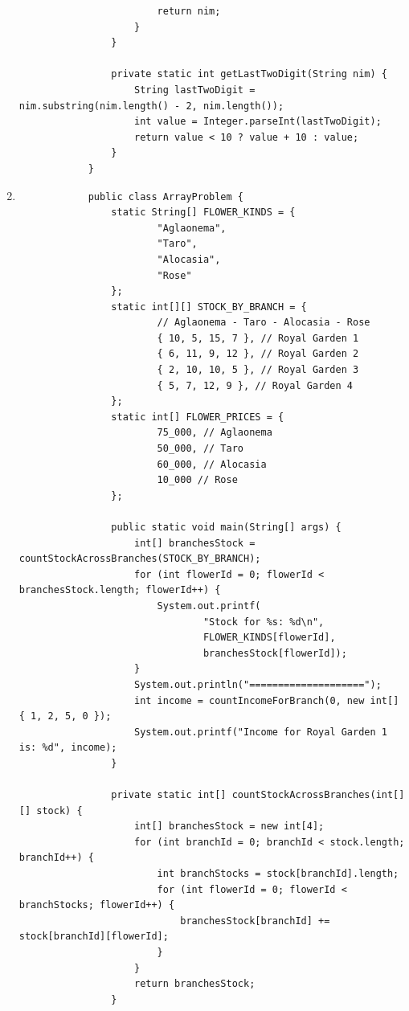 \documentclass[12pt,titlepage]{article}
\begin{document}
\begin{enumerate}
{\begin{verbatim}
                        return nim;
                    }
                }

                private static int getLastTwoDigit(String nim) {
                    String lastTwoDigit = nim.substring(nim.length() - 2, nim.length());
                    int value = Integer.parseInt(lastTwoDigit);
                    return value < 10 ? value + 10 : value;
                }
            }
        \end{verbatim}
    }
    \item {
        \begin{verbatim}
            public class ArrayProblem {
                static String[] FLOWER_KINDS = {
                        "Aglaonema",
                        "Taro",
                        "Alocasia",
                        "Rose"
                };
                static int[][] STOCK_BY_BRANCH = {
                        // Aglaonema - Taro - Alocasia - Rose
                        { 10, 5, 15, 7 }, // Royal Garden 1
                        { 6, 11, 9, 12 }, // Royal Garden 2
                        { 2, 10, 10, 5 }, // Royal Garden 3
                        { 5, 7, 12, 9 }, // Royal Garden 4
                };
                static int[] FLOWER_PRICES = {
                        75_000, // Aglaonema
                        50_000, // Taro
                        60_000, // Alocasia
                        10_000 // Rose
                };

                public static void main(String[] args) {
                    int[] branchesStock = countStockAcrossBranches(STOCK_BY_BRANCH);
                    for (int flowerId = 0; flowerId < branchesStock.length; flowerId++) {
                        System.out.printf(
                                "Stock for %s: %d\n",
                                FLOWER_KINDS[flowerId],
                                branchesStock[flowerId]);
                    }
                    System.out.println("====================");
                    int income = countIncomeForBranch(0, new int[] { 1, 2, 5, 0 });
                    System.out.printf("Income for Royal Garden 1 is: %d", income);
                }

                private static int[] countStockAcrossBranches(int[][] stock) {
                    int[] branchesStock = new int[4];
                    for (int branchId = 0; branchId < stock.length; branchId++) {
                        int branchStocks = stock[branchId].length;
                        for (int flowerId = 0; flowerId < branchStocks; flowerId++) {
                            branchesStock[branchId] += stock[branchId][flowerId];
                        }
                    }
                    return branchesStock;
                }


\end{verbatim}}
\end{enumerate}
\end{document}
